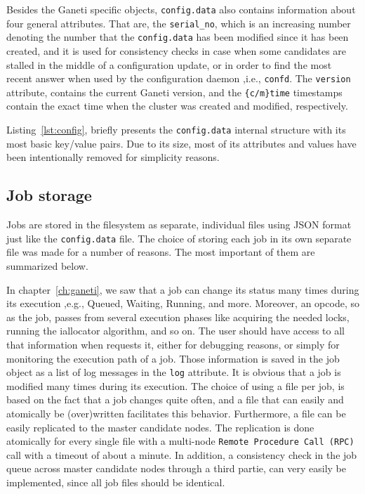 Besides the Ganeti specific objects, \texttt{config.data} also contains
information about four general attributes. That are, the \texttt{serial\_no},
which is an increasing number denoting the number that the \texttt{config.data}
has been modified since it has been created, and it is used for
consistency checks in case when some candidates are stalled in the middle of a
configuration update, or in order to find the most recent answer when used by
the configuration daemon ,i.e., \texttt{confd}. The \texttt{version} attribute,
contains the current Ganeti version, and the \texttt{\{c/m\}time} timestamps
contain the exact time when the cluster was created and modified, respectively.

Listing~\ref{lst:config}, briefly presents the \texttt{config.data} internal
structure with its most basic key/value pairs. Due to its size, most of its
attributes and values have been intentionally removed for simplicity reasons.

\newpage
{}

\subsection{Job storage}\label{sec:queue}

Jobs are stored in the filesystem as separate, individual files using JSON
format just like the \texttt{config.data} file. The choice of storing each job
in its own separate file was made for a number of reasons. The most important of
them are summarized below.

In chapter~\ref{ch:ganeti}, we saw that a job can change its status many times
during its execution ,e.g., Queued, Waiting, Running, and more. Moreover, an
opcode, so as the job, passes from several execution phases like acquiring
the needed locks, running the iallocator algorithm, and so on. The user should
have access to all that information when requests it, either for debugging
reasons, or simply for monitoring the execution path of a job. Those information
is saved in the job object as a list of log messages in the \texttt{log}
attribute. It is obvious that a job is modified many times during its execution.
The choice of using a file per job, is based on the fact
that a job changes quite often, and a file that can easily and atomically be
(over)written facilitates this behavior. Furthermore, a file can be easily
replicated to the master candidate nodes. The replication is done atomically for
every single file with a multi-node \texttt{Remote Procedure Call (RPC)} call
with a timeout of about a minute. In addition, a consistency check in the job
queue across master candidate nodes through a third partie, can very easily be
implemented, since all job files should be identical.

